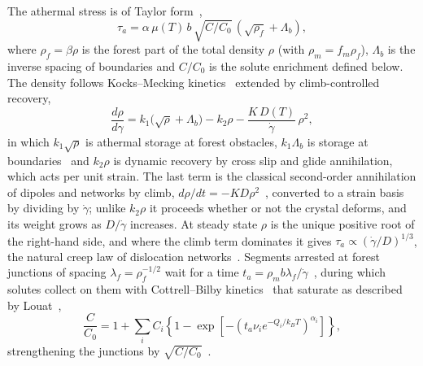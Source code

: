 \documentclass[aps,prl,twocolumn,superscriptaddress,amsmath,amssymb,floatfix]{revtex4-2}
\newcommand{\gd}{\dot\gamma}
\newcommand{\kT}{k_BT}
\begin{document}
The athermal stress is of Taylor form~\cite{Taylor1934,KocksMecking2003},
\begin{equation}
\tau_a=\alpha\,\mu(T)\,b\,\sqrt{C/C_0}\,\left(\sqrt{\rho_f}+\Lambda_b\right),
\label{eq:taua}
\end{equation}
where $\rho_f=\beta\rho$ is the forest part of the total density $\rho$ (with $\rho_m=f_m\rho_f$), $\Lambda_b$ is the inverse spacing of boundaries and $C/C_0$ is the solute enrichment defined below. The density follows Kocks--Mecking kinetics~\cite{Kocks1976,MeckingKocks,KocksMecking2003} extended by climb-controlled recovery,
\begin{equation}
\frac{d\rho}{d\gamma}=k_1\big(\sqrt\rho+\Lambda_b\big)-k_2\rho-\frac{K\,D(T)}{\gd}\,\rho^2 ,
\label{eq:km}
\end{equation}
in which $k_1\sqrt\rho$ is athermal storage at forest obstacles, $k_1\Lambda_b$ is storage at boundaries~\cite{EstrinMecking1984,Estrin1996} and $k_2\rho$ is dynamic recovery by cross slip and glide annihilation, which acts per unit strain. The last term is the classical second-order annihilation of dipoles and networks by climb, $d\rho/dt=-KD\rho^2$~\cite{SandstromLagneborg1975,Sandstrom1977,Nes1995,SandstromHallgren2012}, converted to a strain basis by dividing by $\gd$; unlike $k_2\rho$ it proceeds whether or not the crystal deforms, and its weight grows as $D/\gd$ increases. At steady state $\rho$ is the unique positive root of the right-hand side, and where the climb term dominates it gives $\tau_a\propto(\gd/D)^{1/3}$, the natural creep law of dislocation networks~\cite{Poirier1985,Blum2002}. Segments arrested at forest junctions of spacing $\lambda_f=\rho_f^{-1/2}$ wait for a time $t_a=\rho_mb\lambda_f/\gd$~\cite{McCormick1988,KubinEstrin1990}, during which solutes collect on them with Cottrell--Bilby kinetics~\cite{CottrellBilby} that saturate as described by Louat~\cite{Louat1981},
\begin{equation}
\frac{C}{C_0}=1+\sum_iC_i\left\{1-\exp\!\left[-\left(t_a\nu_ie^{-Q_i/\kT}\right)^{\alpha_i}\right]\right\},
\label{eq:aging}
\end{equation}
strengthening the junctions by $\sqrt{C/C_0}$~\cite{Cheng2001,MulfordKocks1979}.
\end{document}
